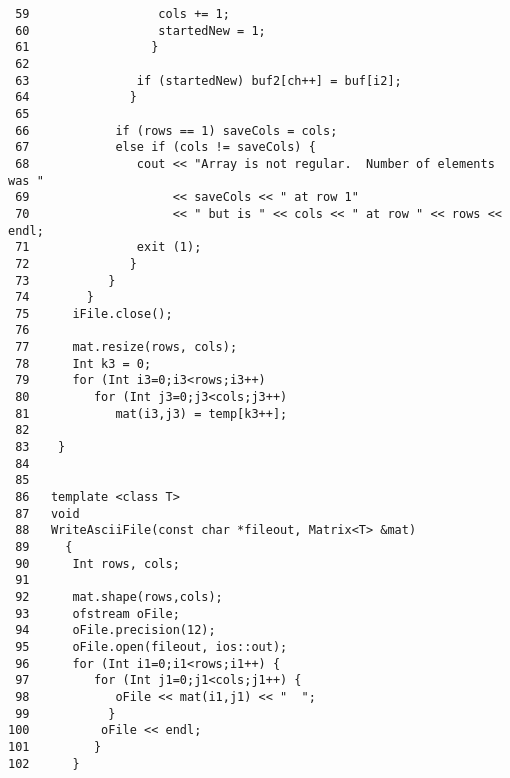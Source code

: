 \begin{verbatim}
 59                  cols += 1;
 60                  startedNew = 1;
 61                 }
 62
 63               if (startedNew) buf2[ch++] = buf[i2];
 64              }
 65
 66            if (rows == 1) saveCols = cols;
 67            else if (cols != saveCols) {
 68               cout << "Array is not regular.  Number of elements was "
 69                    << saveCols << " at row 1"
 70                    << " but is " << cols << " at row " << rows << endl;
 71               exit (1);
 72              }
 73           }
 74        }
 75      iFile.close();
 76
 77      mat.resize(rows, cols);
 78      Int k3 = 0;
 79      for (Int i3=0;i3<rows;i3++)
 80         for (Int j3=0;j3<cols;j3++)
 81            mat(i3,j3) = temp[k3++];
 82
 83    }
 84
 85
 86   template <class T>
 87   void
 88   WriteAsciiFile(const char *fileout, Matrix<T> &mat)
 89     {
 90      Int rows, cols;
 91
 92      mat.shape(rows,cols);
 93      ofstream oFile;
 94      oFile.precision(12);
 95      oFile.open(fileout, ios::out);
 96      for (Int i1=0;i1<rows;i1++) {
 97         for (Int j1=0;j1<cols;j1++) {
 98            oFile << mat(i1,j1) << "  ";
 99           }
100          oFile << endl;
101         }
102      }

\end{verbatim}

